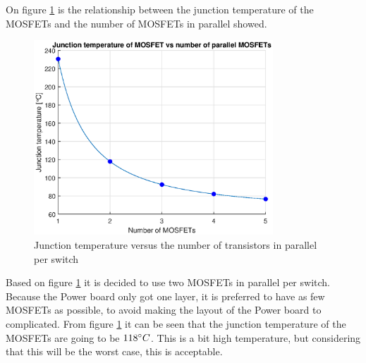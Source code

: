 On figure \ref{fig:junctionTemp} is the relationship between the junction temperature of the MOSFETs and the number of MOSFETs in parallel showed. 

    \begin{figure}[H]
		\centering
		\includegraphics[width=0.8\textwidth]{pictures/hardware/Power_Board/Juntion_temp.eps}
		\caption{Junction temperature versus the number of transistors in parallel per switch}
		\label{fig:junctionTemp}
	\end{figure}

Based on figure \ref{fig:junctionTemp} it is decided to use two MOSFETs in parallel per switch. Because the Power board only got one layer, it is preferred to have as few MOSFETs as possible, to avoid making the layout of the Power board to complicated. From figure \ref{fig:junctionTemp} it can be seen that the junction temperature of the MOSFETs are going to be $118 \degree C$. This is a bit high temperature, but considering that this will be the worst case, this is acceptable.